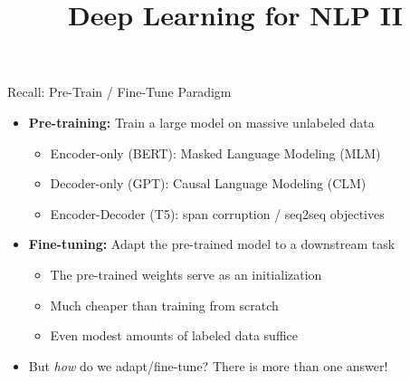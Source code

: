 \documentclass[11pt,compress,t,notes=noshow, xcolor=table]{beamer}
\title{Deep Learning for NLP II}
\begin{document}


\begin{frame}{Recall: Pre-Train / Fine-Tune Paradigm}

\vfill

\begin{itemize}
  \item \textbf{Pre-training:} Train a large model on massive unlabeled data
    \begin{itemize}
      \item Encoder-only (BERT): Masked Language Modeling (MLM)
      \item Decoder-only (GPT): Causal Language Modeling (CLM)
      \item Encoder-Decoder (T5): span corruption / seq2seq objectives
    \end{itemize}
  \item \textbf{Fine-tuning:} Adapt the pre-trained model to a downstream task
    \begin{itemize}
      \item The pre-trained weights serve as an initialization
      \item Much cheaper than training from scratch
      \item Even modest amounts of labeled data suffice
    \end{itemize}
  \item \ques But \textit{how} do we adapt/fine-tune? There is more than one answer!
\end{itemize}

\vfill

\end{frame}

\end{document}
